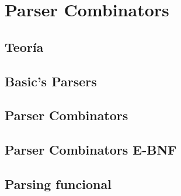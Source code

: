 
\chapter{Parser Combinators}

\section{Teoría}

\section{Basic's Parsers}

\section{Parser Combinators}

\section{Parser Combinators E-BNF}
	
\section{Parsing funcional}




